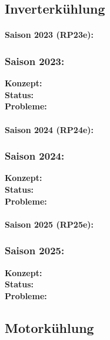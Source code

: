 \subsection{Inverterkühlung}
\label{subsec:Inverter_cooling_status}


\paragraph{Saison 2023 (RP23e):} 

\subsubsection{Saison 2023: }
\textbf{Konzept:}  \\
\textbf{Status:}  \\
\textbf{Probleme:} 



\paragraph{Saison 2024 (RP24e):} 

\subsubsection{Saison 2024: }
\textbf{Konzept:}  \\
\textbf{Status:}  \\
\textbf{Probleme:} 



\paragraph{Saison 2025 (RP25e):} 

\subsubsection{Saison 2025: }
\textbf{Konzept:}  \\
\textbf{Status:}  \\
\textbf{Probleme:} 





\subsection{Motorkühlung}
\label{subsec:Engine_cooling_status}

